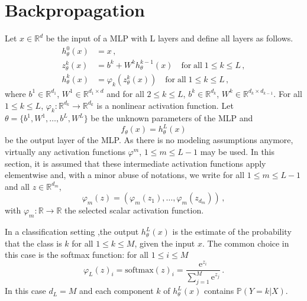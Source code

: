 \documentclass[a4paper,10pt,fleqn]{article}
\newcommand{\eqsp}{\,}
\newcommand{\rset}{\ensuremath{\mathbb{R}}}
\newcommand{\rme}{\ensuremath{\mathrm{e}}}
\newcommand{\1}{\ensuremath{\mathbbm{1}}}
\begin{document}
\section*{Backpropagation}
Let $x\in\rset^d$ be the input of a MLP with L layers and define all layers as follows.
\begin{align*}
h_{\theta}^0(x) &= x\eqsp,\\
z_{\theta}^k(x)  &= b^k + W^kh_{\theta}^{k-1}(x)\quad \mathrm{for\;all\;} 1\leqslant k\leqslant L\eqsp,\\
h_{\theta}^k(x)  &= \varphi_k(z_{\theta}^{k}(x))\quad \mathrm{for\;all\;}1\leqslant k\leqslant L\eqsp,
\end{align*}
where $b^1\in\rset^{d_1}$, $W^1\in\rset^{d_1\times d}$ and for all $2\leqslant k\leqslant L$, $b^k\in\rset^{d_k}$, $W^k\in\rset^{d_k\times d_{k-1}}$. For all $1\leqslant k\leqslant L$, $\varphi_k: \rset^{d_k} \to \rset^{d_k}$ is a nonlinear activation function. Let $\theta = \{b^1,W^1,\ldots,b^L,W^L\}$ be the unknown parameters of the MLP and 
$$
f_{\theta}(x) = h_{\theta}^L(x)
$$
 be the output layer of the MLP. As there is no modeling assumptions anymore, virtually any activation functions $\varphi^m$, $1\leqslant m\leqslant L-1$ may be used. In this section, it is assumed that these intermediate activation functions apply elementwise and, with a minor abuse of notations, we write for all $1\leqslant m\leqslant L-1$ and all $z\in\rset^{d_m}$,
$$
\varphi_m(z) = (\varphi_m(z_1),\ldots, \varphi_m(z_{d_m}))\eqsp,
$$
with $\varphi_m: \rset\to \rset$ the selected scalar activation function. 

In a classification setting ,the output $h_{\theta}^L(x)$ is the estimate of the probability that the class is  $k$ for all $1\leqslant k\leqslant M$, given the input $x$. The common choice in this case is the softmax function: for all $1\leqslant i\leqslant M$
$$
\varphi_L(z)_i = \mathrm{softmax}(z)_i = \frac{\rme^{z_i}}{\sum_{j=1}^M\rme^{z_j}}\eqsp.
$$
In this case $d_L = M$ and each component $k$ of $h_{\theta}^L(x)$ contains $\mathbb{P}(Y=k | X)$.
\end{document}
